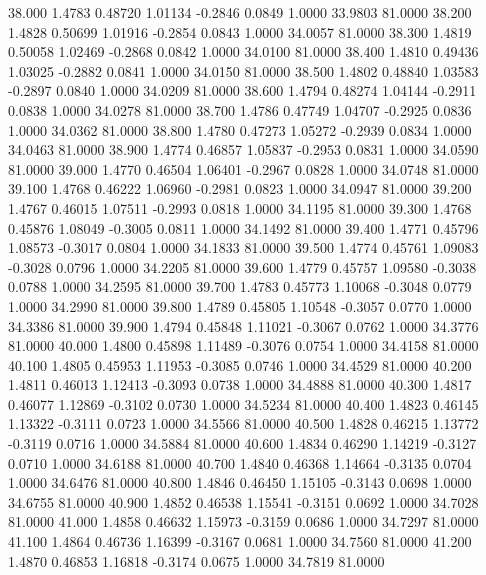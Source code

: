   38.000   1.4783   0.48720   1.01134  -0.2846   0.0849   1.0000  33.9803  81.0000
  38.200   1.4828   0.50699   1.01916  -0.2854   0.0843   1.0000  34.0057  81.0000
  38.300   1.4819   0.50058   1.02469  -0.2868   0.0842   1.0000  34.0100  81.0000
  38.400   1.4810   0.49436   1.03025  -0.2882   0.0841   1.0000  34.0150  81.0000
  38.500   1.4802   0.48840   1.03583  -0.2897   0.0840   1.0000  34.0209  81.0000
  38.600   1.4794   0.48274   1.04144  -0.2911   0.0838   1.0000  34.0278  81.0000
  38.700   1.4786   0.47749   1.04707  -0.2925   0.0836   1.0000  34.0362  81.0000
  38.800   1.4780   0.47273   1.05272  -0.2939   0.0834   1.0000  34.0463  81.0000
  38.900   1.4774   0.46857   1.05837  -0.2953   0.0831   1.0000  34.0590  81.0000
  39.000   1.4770   0.46504   1.06401  -0.2967   0.0828   1.0000  34.0748  81.0000
  39.100   1.4768   0.46222   1.06960  -0.2981   0.0823   1.0000  34.0947  81.0000
  39.200   1.4767   0.46015   1.07511  -0.2993   0.0818   1.0000  34.1195  81.0000
  39.300   1.4768   0.45876   1.08049  -0.3005   0.0811   1.0000  34.1492  81.0000
  39.400   1.4771   0.45796   1.08573  -0.3017   0.0804   1.0000  34.1833  81.0000
  39.500   1.4774   0.45761   1.09083  -0.3028   0.0796   1.0000  34.2205  81.0000
  39.600   1.4779   0.45757   1.09580  -0.3038   0.0788   1.0000  34.2595  81.0000
  39.700   1.4783   0.45773   1.10068  -0.3048   0.0779   1.0000  34.2990  81.0000
  39.800   1.4789   0.45805   1.10548  -0.3057   0.0770   1.0000  34.3386  81.0000
  39.900   1.4794   0.45848   1.11021  -0.3067   0.0762   1.0000  34.3776  81.0000
  40.000   1.4800   0.45898   1.11489  -0.3076   0.0754   1.0000  34.4158  81.0000
  40.100   1.4805   0.45953   1.11953  -0.3085   0.0746   1.0000  34.4529  81.0000
  40.200   1.4811   0.46013   1.12413  -0.3093   0.0738   1.0000  34.4888  81.0000
  40.300   1.4817   0.46077   1.12869  -0.3102   0.0730   1.0000  34.5234  81.0000
  40.400   1.4823   0.46145   1.13322  -0.3111   0.0723   1.0000  34.5566  81.0000
  40.500   1.4828   0.46215   1.13772  -0.3119   0.0716   1.0000  34.5884  81.0000
  40.600   1.4834   0.46290   1.14219  -0.3127   0.0710   1.0000  34.6188  81.0000
  40.700   1.4840   0.46368   1.14664  -0.3135   0.0704   1.0000  34.6476  81.0000
  40.800   1.4846   0.46450   1.15105  -0.3143   0.0698   1.0000  34.6755  81.0000
  40.900   1.4852   0.46538   1.15541  -0.3151   0.0692   1.0000  34.7028  81.0000
  41.000   1.4858   0.46632   1.15973  -0.3159   0.0686   1.0000  34.7297  81.0000
  41.100   1.4864   0.46736   1.16399  -0.3167   0.0681   1.0000  34.7560  81.0000
  41.200   1.4870   0.46853   1.16818  -0.3174   0.0675   1.0000  34.7819  81.0000
